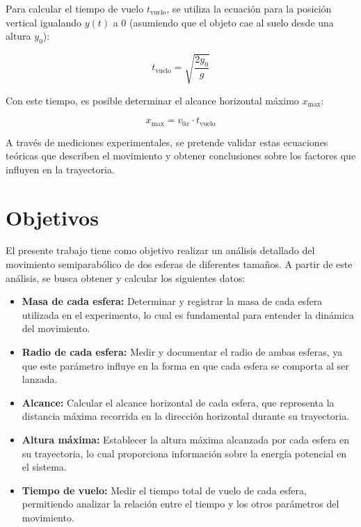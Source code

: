 \documentclass[a4paper,12pt]{article}
\begin{document}
Para calcular el tiempo de vuelo $t_{\text{vuelo}}$, se utiliza la ecuación para la posición vertical igualando $y(t)$ a 0 (asumiendo que el objeto cae al suelo desde una altura $y_0$):

\[
t_{\text{vuelo}} = \sqrt{\frac{2 y_0}{g}}
\]

Con este tiempo, es posible determinar el alcance horizontal máximo $x_{\text{max}}$:

\[
x_{\text{max}} = v_{0x} \cdot t_{\text{vuelo}}
\]

A través de mediciones experimentales, se pretende validar estas ecuaciones teóricas que describen el movimiento y obtener conclusiones sobre los factores que influyen en la trayectoria.

\section*{Objetivos}

El presente trabajo tiene como objetivo realizar un análisis detallado del movimiento semiparabólico de dos esferas de diferentes tamaños. A partir de este análisis, se busca obtener y calcular los siguientes datos:

\begin{itemize}
    \item \textbf{Masa de cada esfera:} Determinar y registrar la masa de cada esfera utilizada en el experimento, lo cual es fundamental para entender la dinámica del movimiento.
    
    \item \textbf{Radio de cada esfera:} Medir y documentar el radio de ambas esferas, ya que este parámetro influye en la forma en que cada esfera se comporta al ser lanzada.

    \item \textbf{Alcance:} Calcular el alcance horizontal de cada esfera, que representa la distancia máxima recorrida en la dirección horizontal durante su trayectoria.

    \item \textbf{Altura máxima:} Establecer la altura máxima alcanzada por cada esfera en su trayectoria, lo cual proporciona información sobre la energía potencial en el sistema.

    \item \textbf{Tiempo de vuelo:} Medir el tiempo total de vuelo de cada esfera, permitiendo analizar la relación entre el tiempo y los otros parámetros del movimiento.
\end{itemize}
\end{document}
